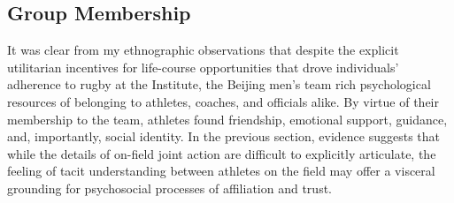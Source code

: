 \begin{CJK}{UTF8}{gbsn}























\clearpage
\subsection{Group Membership\label{sect:groupMembership}}

It was clear from my ethnographic observations that despite the explicit utilitarian incentives for life-course opportunities that drove individuals' adherence to rugby at the Institute, the Beijing men's team rich psychological resources of belonging to athletes, coaches, and officials alike.  By virtue of their membership to the team, athletes found friendship, emotional support, guidance, and, importantly, social identity.  In the previous section, evidence suggests that while the details of on-field joint action are difficult to explicitly articulate, the feeling of tacit understanding between athletes on the field may offer a visceral grounding for psychosocial processes of affiliation and trust.


\end{CJK}
